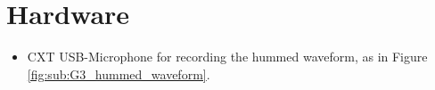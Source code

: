


\section{Hardware}

\begin{itemize}
	\item CXT USB-Microphone for recording the hummed waveform, as in Figure \ref{fig:sub:G3_hummed_waveform}.
\end{itemize}

